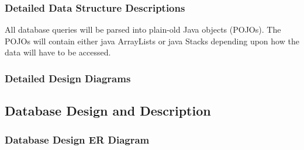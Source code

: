 \documentclass{article}
\begin{document}
\subsubsection{Detailed Data Structure Descriptions}
\label{ddsd}

All database queries will be parsed into plain-old Java objects (POJOs).  The
POJOs will contain either java ArrayLists or java Stacks depending upon how
the data will have to be accessed.


\subsubsection{Detailed Design Diagrams}
\label{ddd}


\pagebreak
\subsection{Database Design and Description}

\subsubsection{Database Design ER Diagram}
\label{dded}
\end{document}
